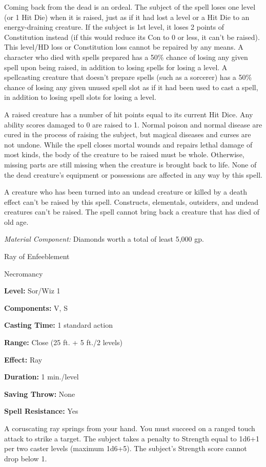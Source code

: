 \documentclass{article}
\begin{document}
Coming back from the dead is an ordeal. The subject of the spell loses one level 
(or 1 Hit Die) when it is raised, just as if it had lost a level or a Hit Die to 
an energy-draining creature. If the subject is 1st level, it loses 2 points of 
Constitution instead (if this would reduce its Con to 0 or less, it can't be raised). 
This level/HD loss or Constitution loss cannot be repaired by any means. A character 
who died with spells prepared has a 50\% chance of losing any given spell upon 
being raised, in addition to losing spells for losing a level. A spellcasting creature 
that doesn't prepare spells (such as a sorcerer) has a 50\% chance of losing any 
given unused spell slot as if it had been used to cast a spell, in addition to 
losing spell slots for losing a level.

A raised creature has a number of hit points equal to its current Hit Dice. Any 
ability scores damaged to 0 are raised to 1. Normal poison and normal disease are 
cured in the process of raising the subject, but magical diseases and curses are 
not undone. While the spell closes mortal wounds and repairs lethal damage of most 
kinds, the body of the creature to be raised must be whole. Otherwise, missing 
parts are still missing when the creature is brought back to life. None of the 
dead creature's equipment or possessions are affected in any way by this spell.

A creature who has been turned into an undead creature or killed by a death effect 
can't be raised by this spell. Constructs, elementals, outsiders, and undead creatures 
can't be raised. The spell cannot bring back a creature that has died of old age.

\textit{Material Component: }Diamonds worth a total of least 5,000 gp.

\vspace{12pt}
Ray of Enfeeblement

Necromancy

\textbf{Level:} Sor/Wiz 1

\textbf{Components:} V, S

\textbf{Casting Time:} 1 standard action

\textbf{Range:} Close (25 ft. + 5 ft./2 levels)

\textbf{Effect:} Ray

\textbf{Duration:} 1 min./level

\textbf{Saving Throw:} None

\textbf{Spell Resistance:} Yes

A coruscating ray springs from your hand. You must succeed on a ranged touch attack 
to strike a target. The subject takes a penalty to Strength equal to 1d6+1 per 
two caster levels (maximum 1d6+5). The subject's Strength score cannot drop below 
1.
\end{document}
